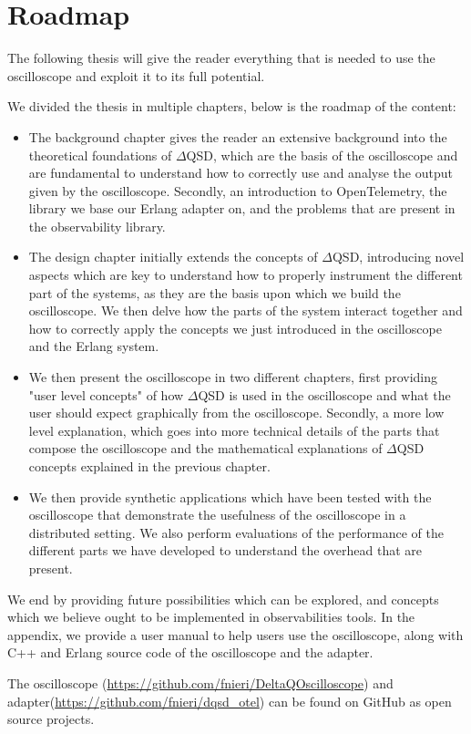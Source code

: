 \section{Roadmap}
    The following thesis will give the reader everything that is needed to use the oscilloscope and exploit it to its full potential.

    We divided the thesis in multiple chapters, below is the roadmap of the content:
    \begin{itemize}
        \item The background chapter gives the reader an extensive background into the theoretical foundations of $\Delta$QSD, which are the basis of the oscilloscope and are fundamental to understand how to correctly use and analyse the output given by the oscilloscope. Secondly, an introduction to OpenTelemetry, the library we base our Erlang adapter on, and the problems that are present in the observability library.
        \item The design chapter initially extends the concepts of $\Delta$QSD, introducing novel aspects which are key to understand how to properly instrument the different part of the systems, as they are the basis upon which we build the oscilloscope. We then delve how the parts of the system interact together and how to correctly apply the concepts we just introduced in the oscilloscope and the Erlang system.
        \item We then present the oscilloscope in two different chapters, first providing "user level concepts" of how $\Delta$QSD is used in the oscilloscope and what the user should expect graphically from the oscilloscope.
            Secondly, a more low level explanation, which goes into more technical details of the parts that compose the oscilloscope and the mathematical explanations of $\Delta$QSD concepts explained in the previous chapter.
        \item We then provide synthetic applications which have been tested with the oscilloscope that demonstrate the usefulness of the oscilloscope in a distributed setting. We also perform evaluations of the performance of the different parts we have developed to understand the overhead that are present.
    \end{itemize}

    We end by providing future possibilities which can be explored, and concepts which we believe ought to be implemented in observabilities tools. 
    In the appendix, we provide a user manual to help users use the oscilloscope, along with C++ and Erlang source code of the oscilloscope and the adapter.

   \sloppy The oscilloscope (\url{https://github.com/fnieri/DeltaQOscilloscope}) and adapter(\url{https://github.com/fnieri/dqsd_otel}) can be found on GitHub as open source projects.
